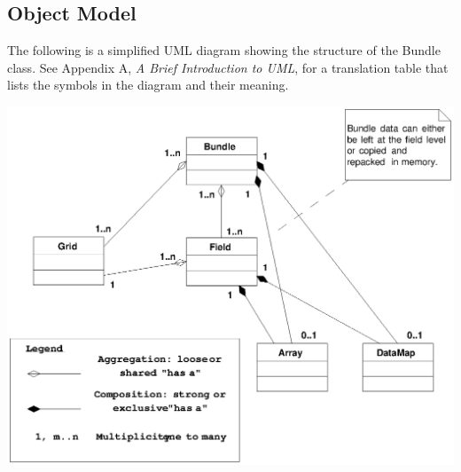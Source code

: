 
\pagebreak
\subsection{Object Model}

The following is a simplified UML diagram showing the structure of the
Bundle class.  See Appendix A, {\it A Brief Introduction to UML},
for a translation table that lists the symbols in the diagram and their 
meaning.

\begin{center}
\includegraphics{bundleclassNH.eps}   
\end{center}
